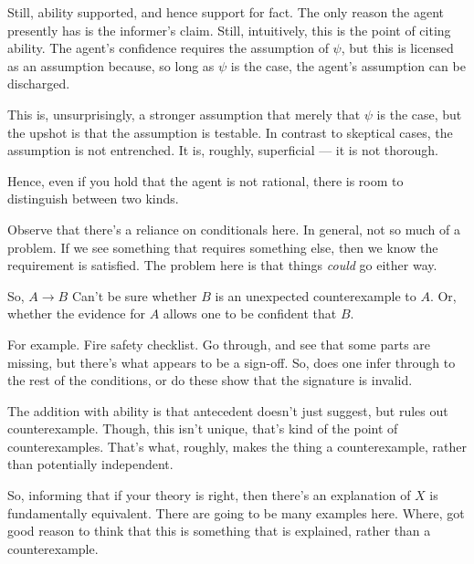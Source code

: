 \documentclass[10pt]{article}
\begin{document}
{
  \color{red}
  Still, ability supported, and hence support for fact.
  The only reason the agent presently has is the informer's claim.
  Still, intuitively, this is the point of citing ability.
  The agent's confidence requires the assumption of \(\psi\), but this is licensed as an assumption because, so long as \(\psi\) is the case, the agent's assumption can be discharged.

  This is, unsurprisingly, a stronger assumption that merely that \(\psi\) is the case, but the upshot is that the assumption is testable.
  In contrast to skeptical cases, the assumption is not entrenched.
  It is, roughly, superficial --- it is not thorough.

  Hence, even if you hold that the agent is not rational, there is room to distinguish between two kinds.
  
}

\begin{note}[Conditional]
  Observe that there's a reliance on conditionals here.
  In general, not so much of a problem.
  If we see something that requires something else, then we know the requirement is satisfied.
  The problem here is that things \emph{could} go either way.

  So, \(A \rightarrow B\)
  Can't be sure whether \(B\) is an unexpected counterexample to \(A\).
  Or, whether the evidence for \(A\) allows one to be confident that \(B\).

  For example.
  Fire safety checklist.
  Go through, and see that some parts are missing, but there's what appears to be a sign-off.
  So, does one infer through to the rest of the conditions, or do these show that the signature is invalid.

  The addition with ability is that antecedent doesn't just suggest, but rules out counterexample.
  Though, this isn't unique, that's kind of the point of counterexamples.
  That's what, roughly, makes the thing a counterexample, rather than potentially independent.

  So, informing that if your theory is right, then there's an explanation of \(X\) is fundamentally equivalent.
  There are going to be many examples here.
  Where, got good reason to think that this is something that is explained, rather than a counterexample.
\end{note}
\end{document}
